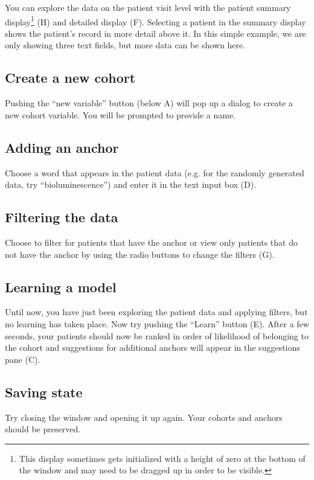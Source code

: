 \documentclass[12pt]{article}
\begin{document}
You can explore the data on the patient visit level with the patient summary display\footnote{This display sometimes gets initialized with a height of zero at the bottom of the window and may need to be dragged up in order to be visible.} (H) and detailed display (F). Selecting a patient in the summary display shows the patient's record in more detail above it. In this simple example, we are only showing three text fields, but more data can be shown here.

\subsection{Create a new cohort}
Pushing the ``new variable'' button (below A) will pop up a dialog to create a new cohort variable. You will be prompted to provide a name.

\subsection{Adding an anchor}

Choose a word that appears in the patient data (e.g. for the randomly generated data, try ``bioluminescence'') and enter it in the text input box (D). 

\subsection{Filtering the data}

Choose to filter for patients that have the anchor or view only patients that do not have the anchor by using the radio buttons to change the filters (G).

\subsection{Learning a model}
Until now, you have just been exploring the patient data and applying filters, but no learning has taken place. Now try pushing the ``Learn'' button (E). After a few seconds, your patients should now be ranked in order of likelihood of belonging to the cohort and suggestions for additional anchors will appear in the suggestions pane (C).

\subsection{Saving state}
Try closing the window and opening it up again. Your cohorts and anchors should be preserved.
\end{document}

